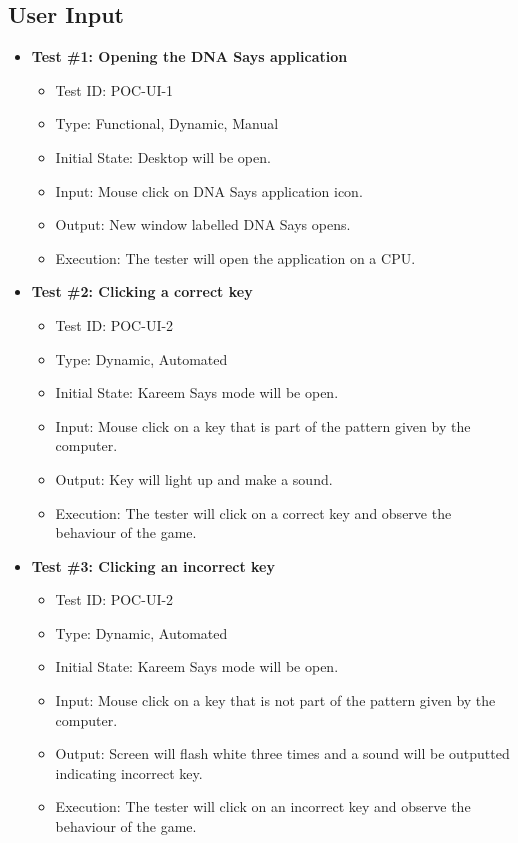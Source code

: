 \documentclass[12pt, titlepage]{article}
\begin{document}
\subsection{User Input}
		
\begin{itemize}

\item \textbf{Test \#1: Opening the DNA Says application}
\begin{itemize}
\item Test ID: POC-UI-1
\item Type: Functional, Dynamic, Manual		
\item Initial State: Desktop will be open. 					
\item Input: Mouse click on DNA Says application icon. 					
\item Output: New window labelled DNA Says opens.					
\item Execution: The tester will open the application on a CPU. 
\end{itemize}

\item \textbf{Test \#2: Clicking a correct key}
\begin{itemize}
\item Test ID: POC-UI-2 
\item Type: Dynamic, Automated		
\item Initial State: Kareem Says mode will be open. 					
\item Input: Mouse click on a key that is part of the pattern given by the computer.					
\item Output: Key will light up and make a sound. 					
\item Execution: The tester will click on a correct key and observe the behaviour of the game.
\end{itemize}

\item \textbf{Test \#3: Clicking an incorrect key}
\begin{itemize}
\item Test ID: POC-UI-2 
\item Type: Dynamic, Automated		
\item Initial State: Kareem Says mode will be open.					
\item Input: Mouse click on a key that is not part of the pattern given by the computer. 					
\item Output: Screen will flash white three times and a sound will be outputted indicating incorrect key. 					
\item Execution: The tester will click on an incorrect key and observe the behaviour of the game.
\end{itemize}

\end{itemize}
\end{document}
